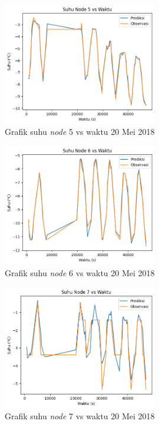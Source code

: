 \begin{figure}[H]
\setlength{}
\begin{center}
\includegraphics[width=0.6\textwidth]{fig/node5_temp_2018-05-20.png}
\caption{Grafik suhu \textit{node} 5 vs waktu 20 Mei 2018}
\label{fig:node520}
\end{center}
\end{figure}

\begin{figure}[H]
\setlength{}
\begin{center}
\includegraphics[width=0.6\textwidth]{fig/node6_temp_2018-05-20.png}
\caption{Grafik suhu \textit{node} 6 vs waktu 20 Mei 2018}
\label{fig:node620}
\end{center}
\end{figure}

\begin{figure}[H]
\setlength{}
\begin{center}
\includegraphics[width=0.6\textwidth]{fig/node7_temp_2018-05-20.png}
\caption{Grafik suhu \textit{node} 7 vs waktu 20 Mei 2018}
\label{fig:node720}
\end{center}
\end{figure}

